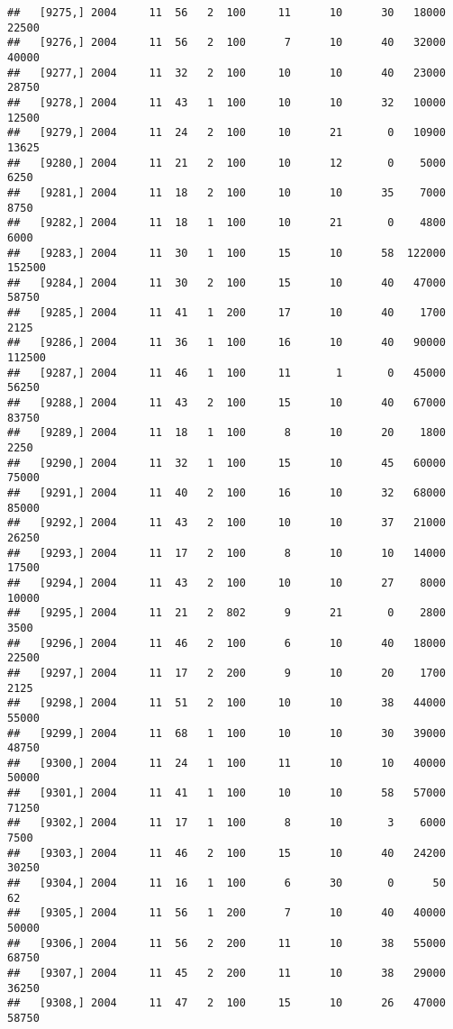 \documentclass{article}\usepackage[]{graphicx}\usepackage[]{color}
\makeatletter
\newenvironment{kframe}{%
 \def\at@end@of@kframe{}%
 \ifinner\ifhmode%
  \def\at@end@of@kframe{\end{minipage}}%
  \begin{minipage}{\columnwidth}%
 \fi\fi%
 \def\FrameCommand##1{\hskip\@totalleftmargin \hskip-\fboxsep
 \colorbox{shadecolor}{##1}\hskip-\fboxsep
     \hskip-\linewidth \hskip-\@totalleftmargin \hskip\columnwidth}%
 \MakeFramed {\advance\hsize-\width
   \@totalleftmargin\z@ \linewidth\hsize
   \@setminipage}}%
 {\par\unskip\endMakeFramed%
 \at@end@of@kframe}
\newenvironment{knitrout}{}{} %
\makeatother
\begin{document}
\begin{knitrout}
\begin{kframe}
\begin{verbatim}
##   [9275,] 2004     11  56   2  100     11      10      30   18000   22500
##   [9276,] 2004     11  56   2  100      7      10      40   32000   40000
##   [9277,] 2004     11  32   2  100     10      10      40   23000   28750
##   [9278,] 2004     11  43   1  100     10      10      32   10000   12500
##   [9279,] 2004     11  24   2  100     10      21       0   10900   13625
##   [9280,] 2004     11  21   2  100     10      12       0    5000    6250
##   [9281,] 2004     11  18   2  100     10      10      35    7000    8750
##   [9282,] 2004     11  18   1  100     10      21       0    4800    6000
##   [9283,] 2004     11  30   1  100     15      10      58  122000  152500
##   [9284,] 2004     11  30   2  100     15      10      40   47000   58750
##   [9285,] 2004     11  41   1  200     17      10      40    1700    2125
##   [9286,] 2004     11  36   1  100     16      10      40   90000  112500
##   [9287,] 2004     11  46   1  100     11       1       0   45000   56250
##   [9288,] 2004     11  43   2  100     15      10      40   67000   83750
##   [9289,] 2004     11  18   1  100      8      10      20    1800    2250
##   [9290,] 2004     11  32   1  100     15      10      45   60000   75000
##   [9291,] 2004     11  40   2  100     16      10      32   68000   85000
##   [9292,] 2004     11  43   2  100     10      10      37   21000   26250
##   [9293,] 2004     11  17   2  100      8      10      10   14000   17500
##   [9294,] 2004     11  43   2  100     10      10      27    8000   10000
##   [9295,] 2004     11  21   2  802      9      21       0    2800    3500
##   [9296,] 2004     11  46   2  100      6      10      40   18000   22500
##   [9297,] 2004     11  17   2  200      9      10      20    1700    2125
##   [9298,] 2004     11  51   2  100     10      10      38   44000   55000
##   [9299,] 2004     11  68   1  100     10      10      30   39000   48750
##   [9300,] 2004     11  24   1  100     11      10      10   40000   50000
##   [9301,] 2004     11  41   1  100     10      10      58   57000   71250
##   [9302,] 2004     11  17   1  100      8      10       3    6000    7500
##   [9303,] 2004     11  46   2  100     15      10      40   24200   30250
##   [9304,] 2004     11  16   1  100      6      30       0      50      62
##   [9305,] 2004     11  56   1  200      7      10      40   40000   50000
##   [9306,] 2004     11  56   2  200     11      10      38   55000   68750
##   [9307,] 2004     11  45   2  200     11      10      38   29000   36250
##   [9308,] 2004     11  47   2  100     15      10      26   47000   58750

\end{verbatim}
\end{kframe}
\end{knitrout}
\end{document}
